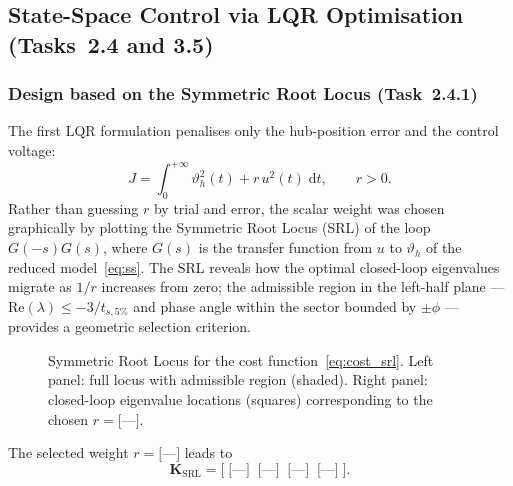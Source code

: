 \documentclass[11pt]{article}
\DeclareRobustCommand{\vect}[1]{ \boldsymbol{#1} }
\newcommand{\thh}{\vartheta_h}
\begin{document}

\subsection{State-Space Control via LQR Optimisation (Tasks~2.4 and 3.5)}

\subsubsection*{Design based on the Symmetric Root Locus (Task~2.4.1)}

The first LQR formulation penalises only the hub-position error and the control voltage:
\begin{equation}
    J = \int_0^{+\infty} \thh^2(t) + r\,u^2(t)\;\mathrm{d}t, \qquad r > 0.
    \label{eq:cost_srl}
\end{equation}
Rather than guessing $r$ by trial and error, the scalar weight was chosen graphically
by plotting the Symmetric Root Locus (SRL) of the loop $G(-s)G(s)$, where $G(s)$ is the
transfer function from $u$ to $\thh$ of the reduced model~\eqref{eq:ss}.  The SRL reveals
how the optimal closed-loop eigenvalues migrate as $1/r$ increases from zero; the admissible
region in the left-half plane — $\mathrm{Re}(\lambda) \le -3/t_{s,5\%}$ and phase angle
within the sector bounded by $\pm\phi$ — provides a geometric selection criterion.

\begin{figure}[H]
    \centering
    \caption{Symmetric Root Locus for the cost function~\eqref{eq:cost_srl}.
             Left panel: full locus with admissible region (shaded). Right panel:
             closed-loop eigenvalue locations (squares) corresponding to the chosen
             $r = \texttt{[---]}$.}
    \label{fig:srl}
\end{figure}

The selected weight $r = \texttt{[---]}$ leads to
\begin{equation}
    \vect{K}_\mathrm{SRL} = \bigl[\;\texttt{[---]}\;\;\texttt{[---]}\;\;\texttt{[---]}\;\;\texttt{[---]}\;\bigr].
\end{equation}
\end{document}
